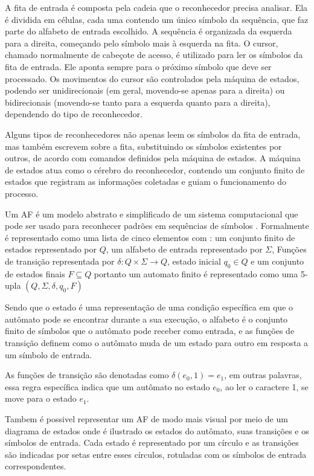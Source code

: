 A fita de entrada é composta pela cadeia que o reconhecedor precisa analisar. Ela é dividida em células, cada uma contendo um único símbolo da sequência, que faz parte do alfabeto de entrada escolhido. A sequência é organizada da esquerda para a direita, começando pelo símbolo mais à esquerda na fita. O cursor, chamado normalmente de cabeçote de acesso, é utilizado para ler os símbolos da fita de entrada. Ele aponta sempre para o próximo símbolo que deve ser processado. Os movimentos do cursor são controlados pela máquina de estados, podendo ser unidirecionais (em geral, movendo-se apenas para a direita) ou bidirecionais (movendo-se tanto para a esquerda quanto para a direita), dependendo do tipo de reconhecedor\cite{reconhecimento}.

Alguns tipos de reconhecedores não apenas leem os símbolos da fita de entrada, mas também escrevem sobre a fita, substituindo os símbolos existentes por outros, de acordo com comandos definidos pela máquina de estados. A máquina de estados atua como o cérebro do reconhecedor, contendo um conjunto finito de estados que registram as informações coletadas e guiam o funcionamento do processo\cite{reconhecimento}.


Um \ac{AF} é um modelo abstrato e simplificado de um sistema computacional que pode ser usado para reconhecer padrões em sequências de símbolos \cite{afd}. Formalmente é representado como uma lista de cinco elementos  com : 
um conjunto finito de estados representado por $Q$, um alfabeto de entrada representado por $\Sigma$, Funções de transição representada por $\delta : Q \times \Sigma \rightarrow Q$, estado inicial $q_0 \in Q$ e um conjunto de estados finais $F \subseteq Q$ portanto um automato finito é representado como uma 5-upla $(Q, \Sigma, \delta, q_0, F)$

Sendo que o estado é uma representação de uma condição específica em que o autômato pode se encontrar durante a sua execução, o alfabeto é o conjunto finito de símbolos que o autômato pode receber como entrada, e as funções de transição definem como o autômato muda de um estado para outro em resposta a um símbolo de entrada.

As funções de transição são denotadas como $\delta(e_0, 1) = e_1$, em outras palavras, essa regra específica indica que um autômato no estado $e_0$, ao ler o caractere 1, se move para o estado $e_1$.

Tambem é possivel representar um \ac{AF} de modo mais visual por meio de um diagrama de estados onde é ilustrado os estados do autômato, suas transições e os símbolos de entrada. Cada estado é representado por um círculo e as transições são indicadas por setas entre esses círculos, rotuladas com os símbolos de entrada correspondentes.\cite{afd}

